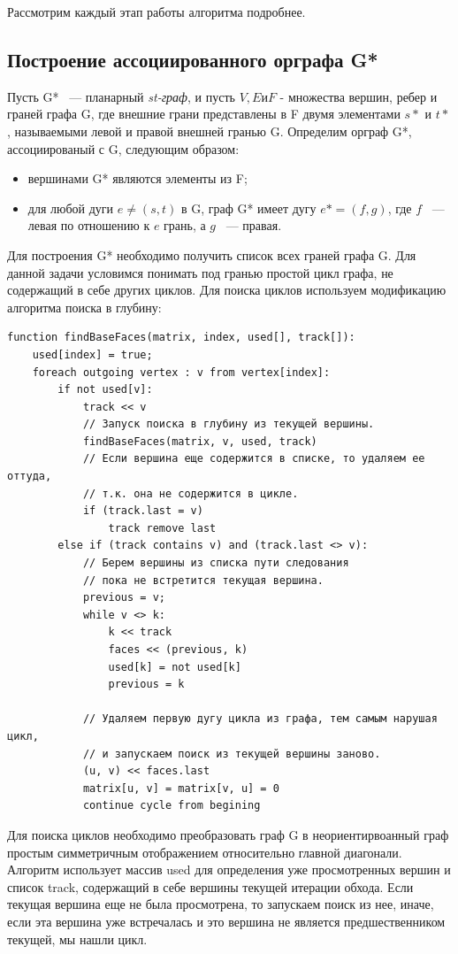 Рассмотрим каждый этап работы алгоритма подробнее.

\subsection{Построение ассоциированного орграфа G*}

Пусть G* ~--- планарный \textit{st-граф}, и пусть $ V, E и F $ - множества вершин, ребер и граней графа G, где внешние грани представлены в F двумя элементами $ s* $ и $ t* $, называемыми левой и правой внешней гранью G.
Определим орграф G*, ассоциированый с G, следующим образом:
\begin{itemize}
\item вершинами G* являются элементы из F;
\item для любой дуги $ e \neq (s, t) $ в G, граф G* имеет дугу $ e* = (f, g) $, где $ f $ ~--- левая по отношению к $ e $ грань, а $ g $ ~--- правая.
\end{itemize}

Для построения G* необходимо получить список всех граней графа G. Для данной задачи условимся понимать под гранью простой цикл графа, не содержащий в себе других циклов. Для поиска циклов используем модификацию алгоритма поиска в глубину:
\begin{verbatim}
function findBaseFaces(matrix, index, used[], track[]):
    used[index] = true;
    foreach outgoing vertex : v from vertex[index]:
        if not used[v]:
            track << v
            // Запуск поиска в глубину из текущей вершины.
            findBaseFaces(matrix, v, used, track)
            // Если вершина еще содержится в списке, то удаляем ее оттуда,
            // т.к. она не содержится в цикле.
            if (track.last = v)
                track remove last
        else if (track contains v) and (track.last <> v):
            // Берем вершины из списка пути следования
            // пока не встретится текущая вершина.
            previous = v;
            while v <> k:
                k << track
                faces << (previous, k)
                used[k] = not used[k]
                previous = k

            // Удаляем первую дугу цикла из графа, тем самым нарушая цикл,
            // и запускаем поиск из текущей вершины заново.
            (u, v) << faces.last
            matrix[u, v] = matrix[v, u] = 0
            continue cycle from begining
\end{verbatim}

Для поиска циклов необходимо преобразовать граф G в неориентирвоанный граф простым симметричным отображением относительно главной диагонали. Алгоритм использует массив used для определения уже просмотренных вершин и список track, содержащий в себе вершины текущей итерации обхода. Если текущая вершина еще не была просмотрена, то запускаем поиск из нее, иначе, если эта вершина уже встречалась и это вершина не является предшественником текущей, мы нашли цикл.


